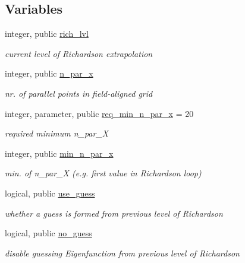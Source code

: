 \subsection*{Variables}
\begin{DoxyCompactItemize}
\item 
integer, public \hyperlink{namespacerich__vars_a1b7734ba9ce6cc153b22387e638093c0}{rich\+\_\+lvl}
\begin{DoxyCompactList}\small\item\em current level of Richardson extrapolation \end{DoxyCompactList}\item 
integer, public \hyperlink{namespacerich__vars_a7a32b8d53450cf925042cd5ddc7e23e6}{n\+\_\+par\+\_\+x}
\begin{DoxyCompactList}\small\item\em nr. of parallel points in field-\/aligned grid \end{DoxyCompactList}\item 
integer, parameter, public \hyperlink{namespacerich__vars_a94e61b5125377ab3e984334998f5ebae}{req\+\_\+min\+\_\+n\+\_\+par\+\_\+x} = 20
\begin{DoxyCompactList}\small\item\em required minimum {\ttfamily n\+\_\+par\+\_\+X} \end{DoxyCompactList}\item 
integer, public \hyperlink{namespacerich__vars_a07841cccca6e6ee59aeb4e0661558eda}{min\+\_\+n\+\_\+par\+\_\+x}
\begin{DoxyCompactList}\small\item\em min. of {\ttfamily n\+\_\+par\+\_\+X} (e.\+g. first value in Richardson loop) \end{DoxyCompactList}\item 
logical, public \hyperlink{namespacerich__vars_aedc7171560db899c515d1610d99582c9}{use\+\_\+guess}
\begin{DoxyCompactList}\small\item\em whether a guess is formed from previous level of Richardson \end{DoxyCompactList}\item 
logical, public \hyperlink{namespacerich__vars_a167fe55b5d9c1a4566729da683466947}{no\+\_\+guess}
\begin{DoxyCompactList}\small\item\em disable guessing Eigenfunction from previous level of Richardson \end{DoxyCompactList}\item 

\end{DoxyCompactItemize}
